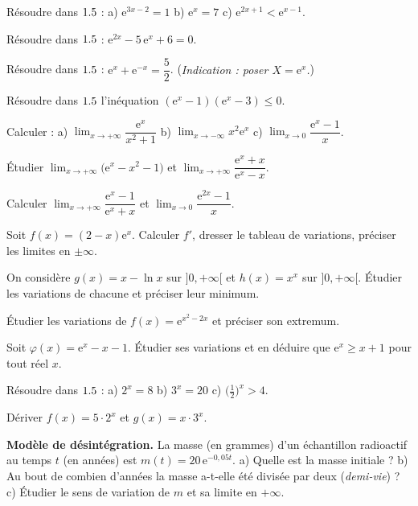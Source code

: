 \exo{} Résoudre dans $1.5$ : a) $\mathrm{e}^{3x-2}=1$ \quad b) $\mathrm{e}^{x}=7$ \quad
c) $\mathrm{e}^{2x+1}<\mathrm{e}^{x-1}$.

\exo{} Résoudre dans $1.5$ : $\mathrm{e}^{2x}-5\,\mathrm{e}^{x}+6=0$.

\exo{} Résoudre dans $1.5$ : $\mathrm{e}^{x}+\mathrm{e}^{-x}=\dfrac{5}{2}$.
(\textit{Indication : poser $X=\mathrm{e}^{x}$.})

\exo{} Résoudre dans $1.5$ l'inéquation
$(\mathrm{e}^{x}-1)(\mathrm{e}^{x}-3)\le 0$.

\exo{} Calculer : a) $\displaystyle\lim_{x\to+\infty}\dfrac{\mathrm{e}^{x}}{x^{2}+1}$ \quad
b) $\displaystyle\lim_{x\to-\infty}x^{2}\mathrm{e}^{x}$ \quad
c) $\displaystyle\lim_{x\to0}\dfrac{\mathrm{e}^{x}-1}{x}$.

\exo{} Étudier $\displaystyle\lim_{x\to+\infty}\big(\mathrm{e}^{x}-x^{2}-1\big)$ et
$\displaystyle\lim_{x\to+\infty}\dfrac{\mathrm{e}^{x}+x}{\mathrm{e}^{x}-x}$.

\exo{} Calculer $\displaystyle\lim_{x\to+\infty}\dfrac{\mathrm{e}^{x}-1}{\mathrm{e}^{x}+x}$
et $\displaystyle\lim_{x\to0}\dfrac{\mathrm{e}^{2x}-1}{x}$.

\exo{} Soit $f(x)=(2-x)\mathrm{e}^{x}$. Calculer $f'$, dresser le tableau de variations,
préciser les limites en $\pm\infty$.

\exo{} On considère $g(x)=x-\ln x$ sur $]0,+\infty[$ et $h(x)=x^{x}$ sur $]0,+\infty[$.
Étudier les variations de chacune et préciser leur minimum.

\exo{} Étudier les variations de $f(x)=\mathrm{e}^{x^{2}-2x}$ et préciser son extremum.

\exo{} Soit $\varphi(x)=\mathrm{e}^{x}-x-1$. Étudier ses variations et en déduire
que $\mathrm{e}^{x}\ge x+1$ pour tout réel $x$.

\exo{} Résoudre dans $1.5$ : a) $2^{x}=8$ \quad b) $3^{x}=20$ \quad
c) $\big(\tfrac12\big)^{x}>4$.

\exo{} Dériver $f(x)=5\cdot 2^{x}$ et $g(x)=x\cdot 3^{x}$.

\exo{} \textbf{Modèle de désintégration.} La masse (en grammes) d'un échantillon
radioactif au temps $t$ (en années) est $m(t)=20\,\mathrm{e}^{-0{,}05t}$.
a) Quelle est la masse initiale ?
b) Au bout de combien d'années la masse a-t-elle été divisée par deux (\textit{demi-vie}) ?
c) Étudier le sens de variation de $m$ et sa limite en $+\infty$.

